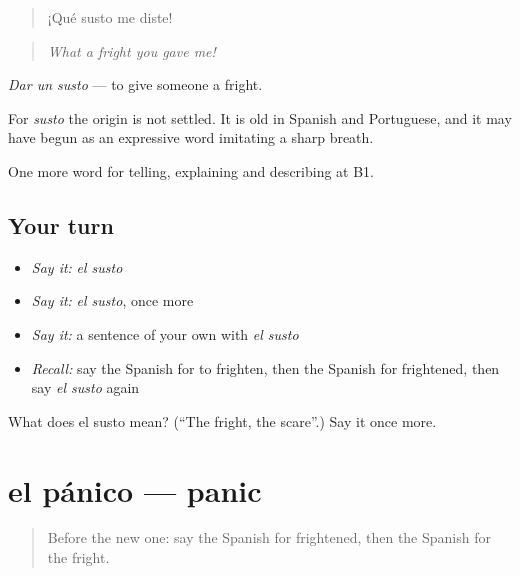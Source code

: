 \begin{quote}
¡Qué susto me diste!
\end{quote}

\begin{quote}
\emph{What a fright you gave me!}
\end{quote}

\emph{Dar un susto} — to give someone a fright.

\begin{cousinweb}
For \emph{susto} the origin is not settled. It is old in Spanish and Portuguese, and it may have begun as an expressive word imitating a sharp breath.
\end{cousinweb}

\begin{grammarlens}[title={What you've built}]
One more word for telling, explaining and describing at B1.
\end{grammarlens}

\subsection*{Your turn}
\begin{itemize}
\raggedright
  \item \emph{Say it:} \emph{el susto}
  \item \emph{Say it:} \emph{el susto}, once more
  \item \emph{Say it:} a sentence of your own with \emph{el susto}
  \item \emph{Recall:} say the Spanish for to frighten, then the Spanish for frightened, then say \emph{el susto} again
\end{itemize}

\begin{tcolorbox}[breakable,colback=teal!4,colframe=teal!35!black,title={Before you move on}]
What does el susto mean? (\textquotedblleft{}The fright, the scare\textquotedblright{}.) Say it once more.
\end{tcolorbox}
\section[el pánico]{el pánico — panic}

\label{lesson:ES-C706-panico}



\begin{quote}
Before the new one: say the Spanish for frightened, then the Spanish for the fright.
\end{quote}

